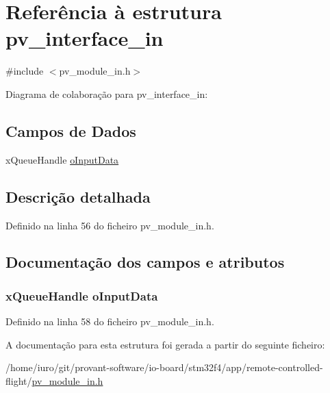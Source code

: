 \hypertarget{structpv__interface__in}{\section{Referência à estrutura pv\-\_\-interface\-\_\-in}
\label{structpv__interface__in}
}


{\ttfamily \#include $<$pv\-\_\-module\-\_\-in.\-h$>$}



Diagrama de colaboração para pv\-\_\-interface\-\_\-in\-:
\subsection*{Campos de Dados}
\begin{DoxyCompactItemize}
\item 
x\-Queue\-Handle \hyperlink{structpv__interface__in_a1b28b7bd6ca96936bf91240eea51d3b9}{o\-Input\-Data}
\end{DoxyCompactItemize}


\subsection{Descrição detalhada}


Definido na linha 56 do ficheiro pv\-\_\-module\-\_\-in.\-h.



\subsection{Documentação dos campos e atributos}
\hypertarget{structpv__interface__in_a1b28b7bd6ca96936bf91240eea51d3b9}{
\subsubsection[{o\-Input\-Data}]{\setlength{\rightskip}{0pt plus 5cm}x\-Queue\-Handle o\-Input\-Data}}\label{structpv__interface__in_a1b28b7bd6ca96936bf91240eea51d3b9}


Definido na linha 58 do ficheiro pv\-\_\-module\-\_\-in.\-h.



A documentação para esta estrutura foi gerada a partir do seguinte ficheiro\-:\begin{DoxyCompactItemize}
\item 
/home/iuro/git/provant-\/software/io-\/board/stm32f4/app/remote-\/controlled-\/flight/\hyperlink{pv__module__in_8h}{pv\-\_\-module\-\_\-in.\-h}\end{DoxyCompactItemize}
